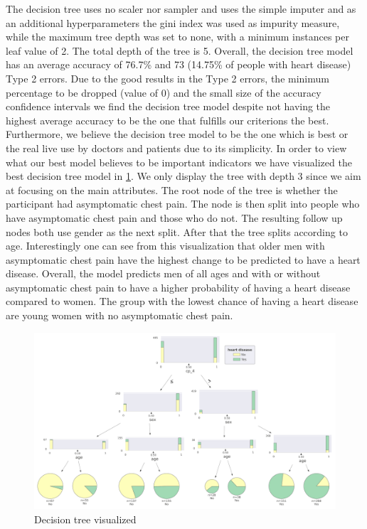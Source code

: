 The decision tree uses no scaler nor sampler and uses the simple imputer and as an additional hyperparameters the gini index was used as impurity measure, while the maximum tree depth was set to none, with a minimum instances per leaf value of 2. The total depth of the tree is 5. Overall, the decision tree model has an average accuracy of 76.7\% and 73 (14.75\% of people with heart disease) Type 2 errors. Due to the good results in the Type 2 errors, the minimum percentage to be dropped (value of 0) and the small size of the accuracy confidence intervals we find the decision tree model despite not having the highest average accuracy to be the one that fulfills our criterions the best. Furthermore, we believe the decision tree model to be the one which is best or the real live use by doctors and patients due to its simplicity.
In order to view what our best model believes to be important indicators we have visualized the best decision tree model in \cref{fig:DecisionTree}. We only display the tree with depth 3 since we aim at focusing on the main attributes. The root node of the tree is whether the participant had asymptomatic chest pain. The node is then split into people who have asymptomatic chest pain and those who do not. The resulting follow up nodes both use gender as the next split. After that the tree splits according to age. Interestingly one can see from this visualization that older men with asymptomatic chest pain have the highest change to be predicted to have a heart disease. Overall, the model predicts men of all ages and with or without asymptomatic chest pain to have a higher probability of having a heart disease compared to women. The group with the lowest chance of having a heart disease are young women with no asymptomatic chest pain.

\begin{figure}[h]
	\centering
	\includegraphics[width=\textwidth]{images/DecisionTree.png}
	\caption{Decision tree visualized}
	\label{fig:DecisionTree}
\end{figure}